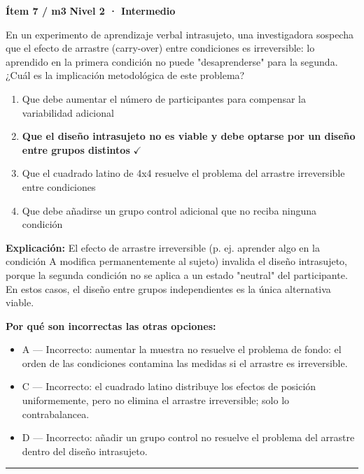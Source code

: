 \documentclass[12pt,a4paper]{article}
\begin{document}
\begin{mdframed}[backgroundcolor=fondogris,linecolor=ambar,linewidth=1pt,innerleftmargin=10pt,innerrightmargin=10pt,innertopmargin=7pt,innerbottommargin=7pt]
\textbf{Ítem 7 / m3} \hfill {\small\bfseries\color{ambar} Nivel 2 · Intermedio}
\end{mdframed}

En un experimento de aprendizaje verbal intrasujeto, una investigadora sospecha que el efecto de arrastre (carry-over) entre condiciones es irreversible: lo aprendido en la primera condición no puede "desaprenderse" para la segunda. ¿Cuál es la implicación metodológica de este problema?

\begin{enumerate}
  \item[A.] Que debe aumentar el número de participantes para compensar la variabilidad adicional
  \item[\textbf{\color{verde}B.}] \textbf{\color{verde} Que el diseño intrasujeto no es viable y debe optarse por un diseño entre grupos distintos} \hfill $\checkmark$
  \item[C.] Que el cuadrado latino de 4x4 resuelve el problema del arrastre irreversible entre condiciones
  \item[D.] Que debe añadirse un grupo control adicional que no reciba ninguna condición
\end{enumerate}

\noindent\textbf{\color{azul}Explicación:} El efecto de arrastre irreversible (p. ej. aprender algo en la condición A modifica permanentemente al sujeto) invalida el diseño intrasujeto, porque la segunda condición no se aplica a un estado "neutral" del participante. En estos casos, el diseño entre grupos independientes es la única alternativa viable.

\noindent\textbf{\color{gris}Por qué son incorrectas las otras opciones:}
\begin{itemize}
  \item {\small A — Incorrecto: aumentar la muestra no resuelve el problema de fondo: el orden de las condiciones contamina las medidas si el arrastre es irreversible.}
  \item {\small C — Incorrecto: el cuadrado latino distribuye los efectos de posición uniformemente, pero no elimina el arrastre irreversible; solo lo contrabalancea.}
  \item {\small D — Incorrecto: añadir un grupo control no resuelve el problema del arrastre dentro del diseño intrasujeto.}
\end{itemize}
\vspace{8pt}\hrule\vspace{10pt}
\end{document}
